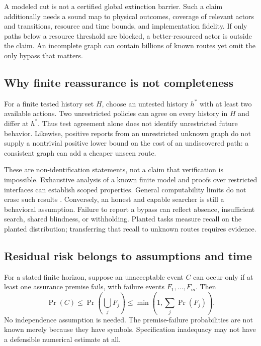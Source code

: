\documentclass[10pt,twocolumn,letterpaper]{article}
\begin{document}
A modeled cut is not a certified global extinction barrier. Such a claim additionally needs a sound map to physical outcomes, coverage of relevant actors and transitions, resource and time bounds, and implementation fidelity. If only paths below a resource threshold are blocked, a better-resourced actor is outside the claim. An incomplete graph can contain billions of known routes yet omit the only bypass that matters.

\subsection{Why finite reassurance is not completeness}
For a finite tested history set $H$, choose an untested history $h^*$ with at least two available actions. Two unrestricted policies can agree on every history in $H$ and differ at $h^*$. Thus test agreement alone does not identify unrestricted future behavior. Likewise, positive reports from an unrestricted unknown graph do not supply a nontrivial positive lower bound on the cost of an undiscovered path: a consistent graph can add a cheaper unseen route.

These are non-identification statements, not a claim that verification is impossible. Exhaustive analysis of a known finite model and proofs over restricted interfaces can establish scoped properties. General computability limits do not erase such results \cite{uncontainable,containment}. Conversely, an honest and capable searcher is still a behavioral assumption. Failure to report a bypass can reflect absence, insufficient search, shared blindness, or withholding. Planted tasks measure recall on the planted distribution; transferring that recall to unknown routes requires evidence.

\subsection{Residual risk belongs to assumptions and time}
For a stated finite horizon, suppose an unacceptable event $C$ can occur only if at least one assurance premise fails, with failure events $F_1,\ldots,F_m$. Then
\begin{equation}
\Pr(C)\leq\Pr\!\left(\bigcup_jF_j\right)
\leq\min\!\left(1,\sum_j\Pr(F_j)\right).
\label{eq:premises}
\end{equation}
No independence assumption is needed. The premise-failure probabilities are not known merely because they have symbols. Specification inadequacy may not have a defensible numerical estimate at all.
\end{document}
